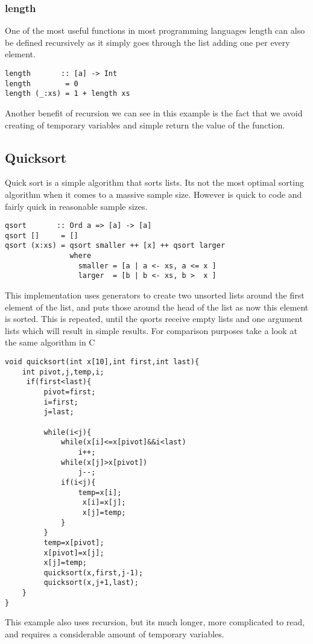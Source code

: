 \documentclass[12pt, oneside]{article}
\begin{document}
\subsubsection{length}
One of the most useful functions in most programming languages length can also be defined recursively as it simply goes through the list adding one per every element.
\begin{lstlisting}
length       :: [a] -> Int
length        = 0
length (_:xs) = 1 + length xs
\end{lstlisting}
Another benefit of recursion we can see in this example is the fact that we avoid creating of temporary variables and simple return the value of the function.
\subsection{Quicksort}
Quick sort is a simple algorithm that sorts lists. Its not the most optimal sorting algorithm when it comes to a massive sample size. However is quick to code and fairly quick in reasonable sample sizes.
\begin{lstlisting}
qsort       :: Ord a => [a] -> [a]
qsort []     = []
qsort (x:xs) = qsort smaller ++ [x] ++ qsort larger
               where
                 smaller = [a | a <- xs, a <= x ]
                 larger  = [b | b <- xs, b >  x ]
\end{lstlisting}
This implementation uses generators to create two unsorted lists around the first element of the list, and puts those around the head of the list as now this element is sorted. This is repeated, until the qsorts receive empty lists and one argument lists which will result in simple results.
For comparison purposes take a look at the same algorithm in C
\lstset{language=C}
\begin{lstlisting}
void quicksort(int x[10],int first,int last){
    int pivot,j,temp,i;
     if(first<last){
         pivot=first;
         i=first;
         j=last;

         while(i<j){
             while(x[i]<=x[pivot]&&i<last)
                 i++;
             while(x[j]>x[pivot])
                 j--;
             if(i<j){
                 temp=x[i];
                  x[i]=x[j];
                  x[j]=temp;
             }
         }
         temp=x[pivot];
         x[pivot]=x[j];
         x[j]=temp;
         quicksort(x,first,j-1);
         quicksort(x,j+1,last);
    }
}
\end{lstlisting}
\lstset{language=Haskell}
This example also uses recursion, but its much longer, more complicated to read, and requires a considerable amount of temporary variables.
\end{document}

